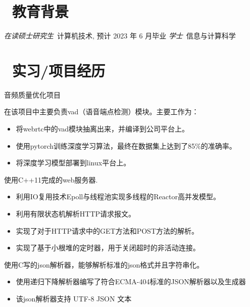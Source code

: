 \documentclass{resume}
\begin{document}



\section{\faGraduationCap\  教育背景}
\textit{在读硕士研究生}\ 计算机技术, 预计 2023 年 6 月毕业
\textit{学士}\ 信息与计算科学

\section{\faUsers\ 实习/项目经历}
 {音频质量优化项目}
\begin{onehalfspacing}
    在该项目中主要负责vad（语音端点检测）模块。主要工作为：
    \begin{itemize}
        \item 将webrtc中的vad模块抽离出来，并编译到公司平台上。
        \item 使用pytorch训练深度学习算法，最终在数据集上达到了85\%的准确率。
        \item 将深度学习模型部署到linux平台上。
    \end{itemize}
\end{onehalfspacing}


\begin{onehalfspacing}
    使用C++11完成的web服务器.
    \begin{itemize}
        \item 利用IO复用技术Epoll与线程池实现多线程的Reactor高并发模型。
        \item 利用有限状态机解析HTTP请求报文。
        \item 实现了对于HTTP请求中的GET方法和POST方法的解析。
        \item 实现了基于小根堆的定时器，用于关闭超时的非活动连接。
    \end{itemize}
\end{onehalfspacing}

\begin{onehalfspacing}
    使用C写的json解析器，能够解析标准的json格式并且字符串化。
    \begin{itemize}
        \item 使用递归下降解析器编写了符合ECMA-404标准的JSON解析器以及生成器
        \item 该json解析器支持 UTF-8 JSON 文本
    \end{itemize}
\end{onehalfspacing}
\end{document}
